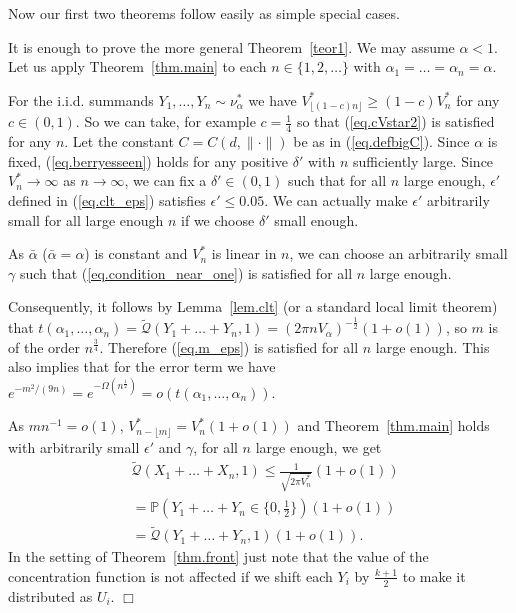 \documentclass{article}
\newenvironment{proofof}[1]{\noindent {\bf Proof of #1}}{\hspace*{\fill}$\Box$}
\newcommand{\pr}{\mathbb P}
\newcommand{\concdiam}{\tilde{\mathcal{Q}}}
\newcommand\nuopt[1]{\nu_{#1}^*}
\begin{document}
\medskip

Now our first two theorems follow easily as simple special cases.

\medskip

\begin{proofof}{Theorem~\ref{thm.front} and Theorem~\ref{teor1}}
 It is enough to prove the more general Theorem~\ref{teor1}. We may assume $\alpha < 1$. Let us apply Theorem~\ref{thm.main} to each $n \in \{1, 2, \dots\}$ with $\alpha_1 = \dots = \alpha_n = \alpha$.

       For the i.i.d. summands $Y_1, \dots, Y_n \sim \nuopt \alpha$ we have $V^*_{\lfloor (1-c)n \rfloor} \ge (1-c) V^*_n$ for any $c \in (0,1)$. So we can take, for example $c=\frac 1 4$ so that (\ref{eq.cVstar2}) is satisfied for any $n$. Let the constant $C = C(d, \|\cdot\|)$ be as in (\ref{eq.defbigC}). 
    Since $\alpha$ is fixed, (\ref{eq.berryesseen}) holds for any positive $\delta'$
    with $n$ sufficiently large. Since $V^*_n \to \infty$ as $n \to \infty$,
    we can fix a $\delta' \in (0,1)$ such that for all $n$ large enough,
    $\epsilon'$ defined in (\ref{eq.clt_eps}) satisfies $\epsilon' \le 0.05$.
    We can actually make $\epsilon'$ arbitrarily small for all large enough $n$ if we choose $\delta'$ small enough.

    As $\bar{\alpha}$ ($\bar{\alpha}=\alpha$) is constant and $V^*_n$ is linear in $n$, we can choose
    an arbitrarily small $\gamma$ such that (\ref{eq.condition_near_one})
    is satisfied for all $n$ large enough.

    Consequently, it follows by Lemma~\ref{lem.clt} (or a standard local limit theorem) that $t(\alpha_1, \dots, \alpha_n) =  \concdiam(Y_1 + \dots +Y_n, 1) = (2 \pi n V_\alpha)^{-\frac 1 2} (1 + o(1))$, so $m$ is of the order $n^{\frac 3 4}$. Therefore (\ref{eq.m_eps}) is satisfied for all $n$ large enough. This also implies that for the error term we have $e^{-m^2/(9n)} = e^{-\Omega(n^{\frac 1 2})} = o(t(\alpha_1, \dots, \alpha_n))$.

    As $m n^{-1}=o(1)$, $V^*_{n-\lfloor m \rfloor} = V^*_n (1+o(1))$ and Theorem~\ref{thm.main} holds with arbitrarily small $\epsilon'$ and $\gamma$,
    for all $n$ large enough, we get
    \begin{align*}
       &\concdiam(X_1 + \dots + X_n, 1) \le \frac 1 {\sqrt{2 \pi V_n^*}} (1 + o(1)) 
        \\ &
        = \pr(Y_1 + \dots + Y_n \in \{0,\frac 1 2\}) (1+o(1))
       \\ &
        = \concdiam(Y_1 + \dots + Y_n, 1) (1 + o(1)).
\end{align*}
    In the setting of Theorem~\ref{thm.front} just note that the value of the concentration function is not affected if
    we shift each $Y_i$ by $\frac {k+1} 2$ to make it distributed as $U_i$.
\end{proofof}
\end{document}
